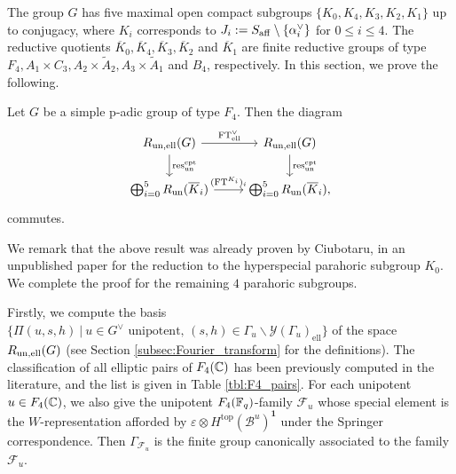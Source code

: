 The group $G$ has five maximal open compact subgroups $\{K_0,K_4,K_3,K_2,K_1\}$ up to conjugacy, where $K_i$ corresponds to $J_i:=S_{\mathrm{aff}}\setminus\{\alpha^\vee_i\}$ for $0\leq i\leq 4$. The reductive quotients $\overline{K}_0,\overline{K}_4,\overline{K}_3,\overline{K}_2$ and $\overline{K}_1$ are finite reductive groups of type $F_4, A_1\times C_3, A_2\times\tilde{A}_2, A_3\times\tilde{A}_1$ and $B_4$, respectively. In this section, we prove the following.

\begin{theorem}\label{thm:F4}
    Let $G$ be a simple p-adic group of type $F_4$. Then the diagram 
    \[
        \begin{tikzcd}
            R_{\un,\mathrm{ell}}(G) \arrow[r, "\FT^\vee_{\mathrm{ell}}"] \arrow[d, "\res_{\un}^{\mathrm{cpt}}"] & R_{\un,\mathrm{ell}}(G) \arrow[d, "\res_{\un}^{\mathrm{cpt}}"] \\
            \bigoplus_{i=0}^5 R_{\un}(\overline{K}_i) \arrow[r, "(\FT^{K_i})_i"] & \bigoplus_{i=0}^5 R_{\un}(\overline{K}_i),
        \end{tikzcd}
    \]
    commutes.
\end{theorem}

We remark that the above result was already proven by Ciubotaru, in an unpublished paper \cite{Ciubotaru2020} for the reduction to the hyperspecial parahoric subgroup $K_0$. We complete the proof for the remaining $4$ parahoric subgroups.

Firstly, we compute the basis $\{\Pi(u,s,h)\ |\ u\in G^\vee\text{ unipotent, } (s,h)\in\Gamma_u\backslash\mathcal{Y}(\Gamma_u)_{\mathrm{ell}}\}$ of the space $R_{\mathrm{un},\text{ell}}(G)$ (see Section \ref{subsec:Fourier_transform} for the definitions). The classification of all elliptic pairs of $F_4(\mathbb{C})$ has been previously computed in the literature, and the list is given in Table \ref{tbl:F4_pairs}. For each unipotent $u\in F_4(\mathbb{C})$, we also give the unipotent $F_4(\mathbb{F}_q)$-family $\mathcal{F}_u$ whose special element is the $W$-representation afforded by $\varepsilon\otimes H^{\mathrm{top}}(\mathcal{B}^u)^{\mathbf{1}}$ under the Springer correspondence. Then $\Gamma_{\mathcal{F}_u}$ is the finite group canonically associated to the family $\mathcal{F}_u$.

